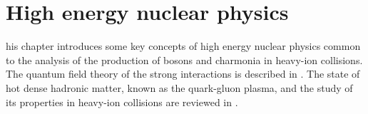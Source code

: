 \clearpage

\chapter{High energy nuclear physics} \label{sec:Physics}


his chapter introduces some key concepts of high energy nuclear physics common to the analysis of the production of {\PW} bosons and charmonia in heavy-ion collisions. The quantum field theory of the strong interactions is described in . The state of hot dense hadronic matter, known as the quark-gluon plasma, and the study of its properties in heavy-ion collisions are reviewed in .



\clearpage
